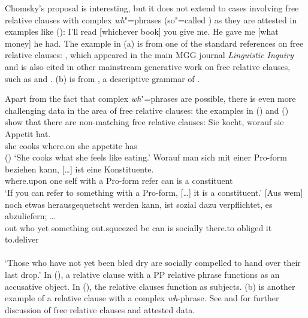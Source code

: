 \documentclass[output=paper
 	        ,biblatex
                ,babelshorthands
                ,newtxmath
                ,draftmode
                ,colorlinks, citecolor=brown
]{langscibook}
\begin{document}
Chomsky's proposal is interesting, but it does not extend to cases involving free relative clauses
with complex \emph{wh}"=phrases (so"=called ) as they are attested in examples like
(): 
\eal
\ex I'll read [whichever book] you give me.
\ex He gave me [what money] he had.
\zl
The example in (a) is from one of the standard references on free relative clauses:
, which appeared in the main MGG journal \emph{Linguistic Inquiry}
and is also cited in other mainstream generative work on free relative clauses, such as
 and . (b) is from , a
descriptive grammar of . 

Apart from the fact that complex \emph{wh}"=phrases are possible, there is even more challenging data in the area of
free relative clauses: the examples in () and () show that there are non-matching free
relative clauses:
\ea
\gll Sie kocht, worauf   sie Appetit  hat.\footnotemark\\
     she cooks  where.on she appetite has\\\hfill()
\glt `She cooks what she feels like eating.'
\z
\eal
\ex
\gll Worauf man sich mit einer Pro-form beziehen kann, [\ldots]  ist eine Kon\-sti\-tu\-en\-te.\footnotemark\\
     where.upon one self with a Pro-form  refer   can  {}        is  a    constituent\\
\glt `If you can refer to something with a Pro-form, [\ldots] it is a constituent.'
\ex
\gll {}[Aus wem] noch etwas herausgequetscht werden kann, ist sozial dazu ver\-pflich\-tet, es
abzuliefern; \ldots\label{bsp-droste}\footnotemark\\
  \spacebr{}out who yet something out.squeezed be can is socially there.to obliged it to.deliver\\
\\
\glt `Those who have not yet been bled dry are socially compelled to hand over their last drop.'
\zl
In (), a relative clause with a PP relative phrase functions as an accusative object. In
(), the relative clauses function as subjects. (b) is another example of a relative
clause with a complex \emph{wh}-phrase. See \citet{Bausewein90} and \citet{Mueller99b} for further discussion of free relative
clauses and attested data.
\end{document}
